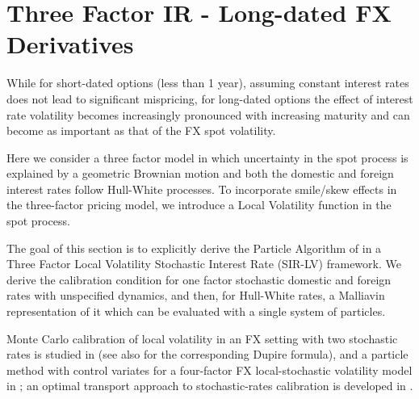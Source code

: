 \section{Three Factor IR - Long-dated FX Derivatives}\label{sec: threeFactor}
While for short-dated options (less than 1 year), assuming constant interest rates does not lead to
significant mispricing, for long-dated options the effect of interest rate volatility becomes increasingly
pronounced with increasing maturity and can become as important as that of the FX spot volatility.

Here we consider a three factor model in which uncertainty in the spot process is explained by a geometric Brownian motion and both the domestic and foreign interest rates follow Hull-White processes.
To incorporate smile/skew effects in the three-factor pricing model, we introduce a Local Volatility function in the spot process.

The goal of this section is to explicitly derive the Particle Algorithm of \cite{guyonLabordere} in a Three Factor Local Volatility Stochastic Interest Rate (SIR-LV) framework. We derive the calibration condition for one factor stochastic domestic and foreign rates with unspecified dynamics, and then, for Hull-White rates, a Malliavin representation of it which can be evaluated with a single system of particles.

Monte Carlo calibration of local volatility in an FX setting with two stochastic rates is studied in \cite{ogetbilGanesanHientzsch} (see also \cite{ogetbilHientzsch} for the corresponding Dupire formula), and a particle method with control variates for a four-factor FX local-stochastic volatility model in \cite{cozma}; an optimal transport approach to stochastic-rates calibration is developed in \cite{josephLoeperObloj}.

